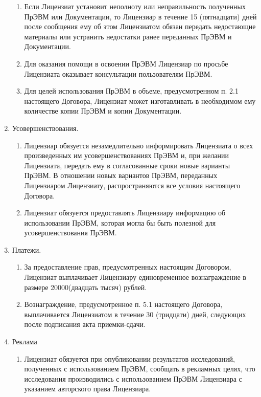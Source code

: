 \begin{enumerate}
\begin{enumerate}
        \item Если Лицензиат установит неполноту или неправильность полученных ПрЭВМ или Документации, то Лицензиар в течение 15 (пятнадцати) дней после сообщения ему об этом Лицензиатом обязан передать недостающие материалы или устранить недостатки ранее переданных ПрЭВМ и Документации.
        \item Для оказания помощи в освоении ПрЭВМ Лицензиар по просьбе Лицензиата оказывает консультации пользователям ПрЭВМ.
        \item Для целей использования ПрЭВМ в объеме, предусмотренном п. 2.1 настоящего Договора, Лицензиат может изготавливать в необходимом ему количестве копии ПрЭВМ и копии Документации.
    \end{enumerate}
    \item Усовершенствования.
    \begin{enumerate}
        \item Лицензиар обязуется незамедлительно информировать Лицензиата о всех произведенных им усовершенствованиях ПрЭВМ и, при желании Лицензиата, передать ему в согласованные сроки новые варианты ПрЭВМ. В отношении новых вариантов ПрЭВМ, переданных Лицензиаром Лицензиату, распространяются все условия настоящего Договора.
        \item Лицензиат обязуется предоставлять Лицензиару информацию об использовании ПрЭВМ, которая могла бы быть полезной для усовершенствования ПрЭВМ.
    \end{enumerate}
    \item Платежи.
    \begin{enumerate}
        \item За предоставление прав, предусмотренных настоящим Договором, Лицензиат выплачивает Лицензиару единовременное вознаграждение в размере 20000(двадцать тысяч) рублей.
        \item Вознаграждение, предусмотренное п. 5.1 настоящего Договора, выплачивается Лицензиатом в течение 30 (тридцати) дней, следующих после подписания акта приемки-сдачи.
    \end{enumerate}
    \item Реклама
    \begin{enumerate}
        \item Лицензиат обязуется при опубликовании результатов исследований, полученных с использованием ПрЭВМ, сообщать в рекламных целях, что исследования производились с использованием ПрЭВМ Лицензиара с указанием авторского права Лицензиара.
    \end{enumerate}

\end{enumerate}
